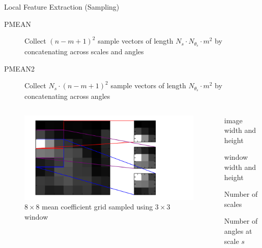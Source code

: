 \documentclass[mathserif]{beamer}
\begin{document}
\begin{frame}{Local Feature Extraction (Sampling)}
    \begin{description}
        \item[PMEAN] Collect $(n - m + 1)^2$ sample vectors of length $N_s \cdot N_{\theta_s} \cdot m^2$ by concatenating across scales and angles
        \item[PMEAN2] Collect $N_s \cdot (n - m + 1)^2$ sample vectors of length $N_{\theta_s} \cdot m^2$ by concatenating across angles
    \end{description}
    \begin{columns}
        \begin{column}{.5\textwidth}
            \begin{figure}
                \includegraphics[width=\textwidth]{illustrations/signature_example_curvelet_patches}
                \caption{$8 \times 8$ mean coefficient grid sampled using $3 \times 3$ window}
            \end{figure}
        \end{column}
        \begin{column}{.5\textwidth}
            \begin{description}[abc]
                \item[$n$] image width and height
                \item[$m$] window width and height
                \item[$N_s$] Number of scales
                \item[$N_{\theta_s}$] Number of angles at scale $s$
            \end{description}
        \end{column}
    \end{columns}
\end{frame}
\end{document}
